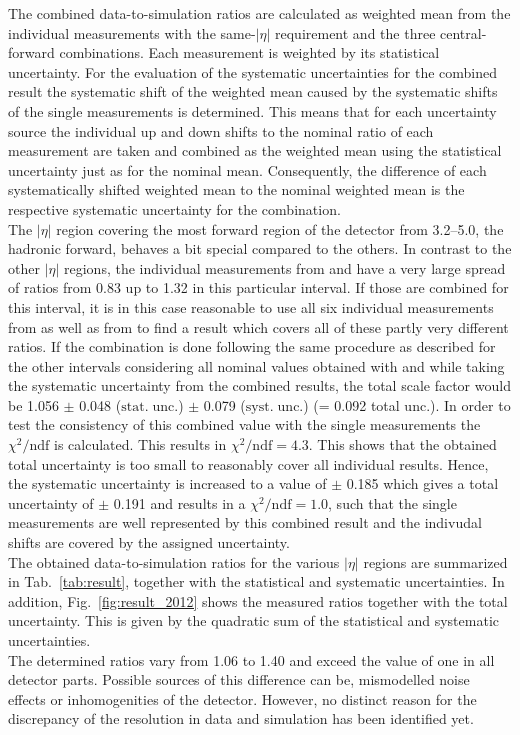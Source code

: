 The combined data-to-simulation ratios are calculated as weighted mean from the individual measurements with the same-$|\eta|$ requirement and the three central-forward combinations. Each measurement is weighted by its statistical uncertainty. For the evaluation of the systematic uncertainties for the combined result the systematic shift of the weighted mean caused by the systematic shifts of the single measurements is determined. This means that for each uncertainty source the individual up and down shifts to the nominal ratio of each measurement are taken and combined as the weighted mean using the statistical uncertainty just as for the nominal mean. Consequently, the difference of each systematically shifted weighted mean to the nominal weighted mean is the respective systematic uncertainty for the combination. \\
The $|\eta|$ region covering the most forward region of the detector from 3.2--5.0, \ie the hadronic forward, behaves a bit special compared to the others. In contrast to the other $|\eta|$ regions, the individual measurements from \pythia and \herwig have a very large spread of ratios from 0.83 up to 1.32 in this particular interval. If those are combined for this interval, it is in this case reasonable to use all six individual measurements from \pythia as well as from \herwig to find a result which covers all of these partly very different ratios. If the combination is done following the same procedure as described for the other intervals considering all nominal values obtained with \pythia and \herwig while taking the systematic uncertainty from the combined \pythia results, the total scale factor would be 1.056 $\pm$ 0.048 ($\mathrm{stat.\; unc.}$) $\pm$ 0.079 ($\mathrm{syst. \; unc.}$) (= 0.092 total unc.). In order to test the consistency of this combined value with the single measurements the $\chi^2/\mathrm{ndf}$ is calculated. This results in $\chi^2/\mathrm{ndf} = 4.3$. This shows that the obtained total uncertainty is too small to reasonably cover all individual results. Hence, the systematic uncertainty is increased to a value of $\pm$ 0.185 which gives a total uncertainty of $\pm$ 0.191 and results in a $\chi^2/\mathrm{ndf} = 1.0$, such that the single measurements are well represented by this combined result and the indivudal shifts are covered by the assigned uncertainty.\\
The obtained data-to-simulation ratios for the various $|\eta|$ regions are summarized in Tab.~\ref{tab:result}, together with the statistical and systematic uncertainties. In addition, Fig.~\ref{fig:result_2012} shows the measured ratios together with the total uncertainty. This is given by the quadratic sum of the statistical and systematic uncertainties. \\
The determined ratios vary from 1.06 to 1.40 and exceed the value of one in all detector parts. Possible sources of this difference can be, \eg mismodelled noise effects or inhomogenities of the detector. However, no distinct reason for the discrepancy of the resolution in data and simulation has been identified yet. 

